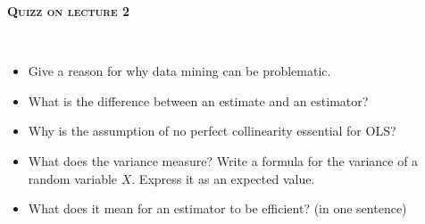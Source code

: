 \documentclass[a4, 12pt]{report}
\begin{document}



\begin{center}
	\Huge \textbf{\textsc{Quizz on lecture 2}}
\end{center}
\normalsize
		~\\
		
	\begin{itemize}
		\item Give a reason for why data mining can be problematic.
			\vspace{3cm}
		\item  What is the difference between an estimate and an estimator?
			\vspace{3cm}
		\item Why is the assumption of no perfect collinearity essential for OLS?
			\vspace{3cm}
		\item What does the variance measure? Write a formula for the variance of a random variable $X$. Express it as an expected value.
			\vspace{4cm}
		\item What does it mean for an estimator to be efficient? (in one sentence)
			\vspace{3cm}
	\end{itemize}
		
		
				
		

				
				
				
\end{document}
